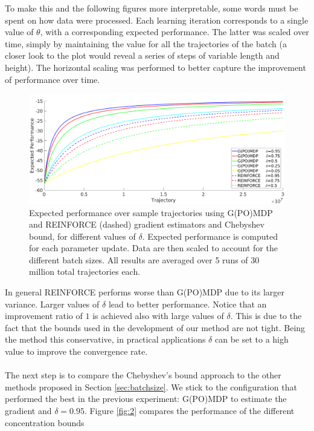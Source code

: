  To make this and the following figures more interpretable, some words must be spent on how data were processed. Each learning iteration corresponds to a single value of $\theta$, with a corresponding expected performance. The latter was scaled over time, simply by maintaining the value for all the trajectories of the batch (a closer look to the plot would reveal a series of steps of variable length and height). The horizontal scaling was performed to better capture the improvement of performance over time.


\begin{figure}[h!]
\includegraphics[width = 1.4\textwidth,left]{Images/chebyshev.png}
\caption{Expected performance over sample trajectories using G(PO)MDP and REINFORCE (dashed) gradient estimators and Chebyshev bound, for different values of $\delta$. Expected performance is computed for each parameter update. Data are then scaled to account for the different batch sizes. All results are averaged over 5 runs of 30 million total trajectories each.}
\label{fig:1}
\end{figure}

In general REINFORCE performs worse than G(PO)MDP due to its larger variance.
Larger values of $\delta$  lead to better performance. Notice that an improvement ratio of $1$ is achieved also with large values of $\delta$. This is due to the fact that the bounds used in the development of our method are not tight. Being the method this conservative, in practical applications $\delta$ can be set to a high value to improve the convergence rate.
\paragraph{}
The next step is to compare the Chebyshev's bound approach to the other methods proposed in Section \ref{sec:batchsize}. We stick to the configuration that performed the best in the previous experiment: G(PO)MDP to estimate the gradient and $\delta=0.95$. 
Figure \ref{fig:2} compares the performance of the different concentration bounds


